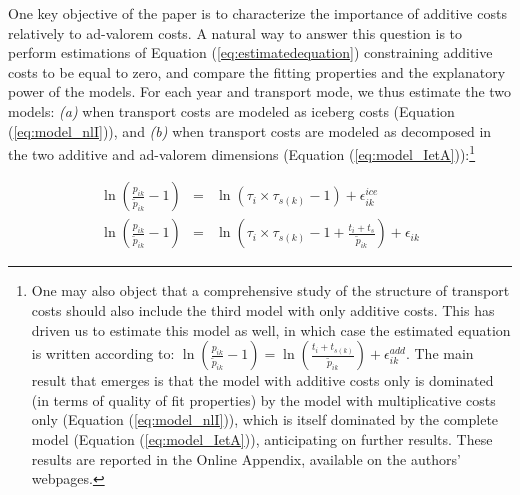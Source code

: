 \documentclass[a4paper,11pt]{article}
\begin{document}
One key objective of the paper is to characterize the importance of additive costs relatively to ad-valorem costs. A natural way to answer this question is to perform estimations of Equation (\ref{eq:estimatedequation}) constraining additive costs to be equal to zero, and compare the fitting properties and the explanatory power of the models. For each year and transport mode, we thus estimate the two models: \textit{(a)} when transport costs are modeled as iceberg costs (Equation (\ref{eq:model_nlI})), and \textit{(b)} when transport costs are modeled as decomposed in the two additive and ad-valorem dimensions (Equation (\ref{eq:model_IetA})):\footnote{One may also object that a comprehensive study of the structure of transport costs should also include the third model with only additive costs. This has driven us to estimate this model as well, in which case the estimated equation is written according to: $\ln\left(\frac{p_{ik}}{\widetilde{p}_{ik}}-1 \right)= \ln \left(\frac{t_{i} + t_{s(k)}}{\widetilde{p}_{ik}}\right) + \epsilon^{add}_{ik}$. The main result that emerges is that the model with additive costs only is dominated (in terms of quality of fit properties) by the model with multiplicative costs only (Equation (\ref{eq:model_nlI})), which is itself dominated by the complete model (Equation (\ref{eq:model_IetA})), anticipating on further results. These results are reported in the Online Appendix, available on the authors' webpages.}

\begin{eqnarray}
\ln\left(\frac{p_{ik}}{\widetilde{p}_{ik}}-1 \right)&=& \ln \left(\tau_{i}\times\tau_{s(k)}-1 \right) + \epsilon^{ice}_{ik} \label{eq:model_nlI} \\
\ln\left(\frac{p_{ik}}{\widetilde{p}_{ik}}-1 \right)&=& \ln \left(\tau_{i} \times \tau_{s(k)}-1 +\frac{t_{i} + t_{s}}{\widetilde{p}_{ik}}\right) + \epsilon_{ik} \label{eq:model_IetA}
\end{eqnarray}
\end{document}
